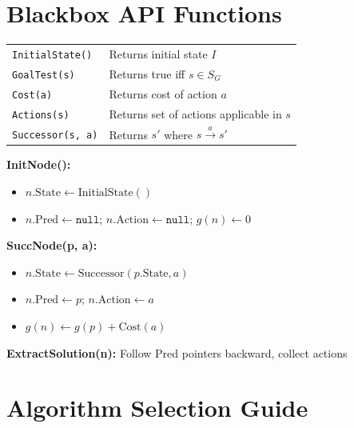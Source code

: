 \documentclass[11pt,a4paper]{article}
\begin{document}
\section{Blackbox API Functions}

\begin{definitionbox}
\begin{tabular}{@{}ll@{}}
\texttt{InitialState()} & Returns initial state $I$ \\
\texttt{GoalTest(s)} & Returns true iff $s \in S_G$ \\
\texttt{Cost(a)} & Returns cost of action $a$ \\
\texttt{Actions(s)} & Returns set of actions applicable in $s$ \\
\texttt{Successor(s, a)} & Returns $s'$ where $s \xrightarrow{a} s'$ \\
\end{tabular}
\end{definitionbox}

\begin{definitionbox}
\textbf{InitNode():}
\begin{itemize}[leftmargin=*,nosep]
\item $n.\text{State} \gets \text{InitialState}()$
\item $n.\text{Pred} \gets \texttt{null}$; $n.\text{Action} \gets \texttt{null}$; $g(n) \gets 0$
\end{itemize}

\textbf{SuccNode(p, a):}
\begin{itemize}[leftmargin=*,nosep]
\item $n.\text{State} \gets \text{Successor}(p.\text{State}, a)$
\item $n.\text{Pred} \gets p$; $n.\text{Action} \gets a$
\item $g(n) \gets g(p) + \text{Cost}(a)$
\end{itemize}

\textbf{ExtractSolution(n):} Follow Pred pointers backward, collect actions
\end{definitionbox}

\section{Algorithm Selection Guide}
\end{document}
